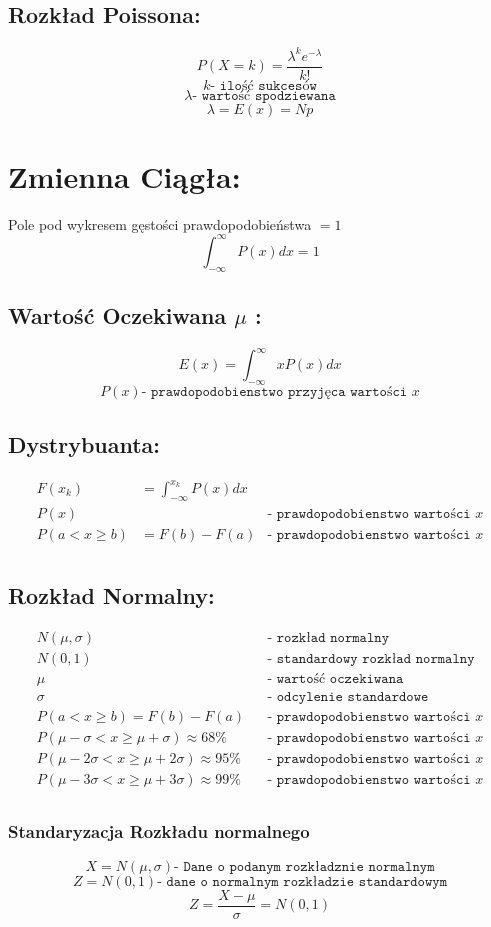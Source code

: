 \documentclass[fleqn]{article}
\begin{document}
\subsection*{Rozkład Poissona:}
\[P(X=k) = \frac{\lambda^ke^{-\lambda}}{k!}\]
\[k \texttt{- ilość sukcesów}\]
\[\lambda \texttt{- wartość spodziewana}\]
\[\lambda = E(x) = Np\]
\pagebreak
\section*{Zmienna Ciągła:}
Pole pod wykresem gęstości prawdopodobieństwa \(=1\)
\[\int_{-\infty}^{\infty}{P(x)dx}=1\]

\subsection*{Wartość Oczekiwana \(\mu\) :}
\[E(x) = \int_{-\infty}^{\infty}{xP(x)dx}\]
\[P(x) \texttt{- prawdopodobienstwo przyjęca wartości }x\]
\subsection*{Dystrybuanta:}
\begin{align*}
F(x_k)& = \int_{-\infty}^{x_k}{P(x)dx}\\
P(x) & & \texttt{- prawdopodobienstwo wartości }x\\
P(a < x \geq b)&= F(b)-F(a) &\texttt{- prawdopodobienstwo wartości }x\\
\end{align*}



\subsection*{Rozkład Normalny:}
\begin{align*}
N(\mu,\sigma)&&\texttt{- rozkład normalny}\\
N(0,1)& &\texttt{- standardowy rozkład normalny}\\
\mu& &\texttt{- wartość oczekiwana}\\
\sigma& &\texttt{- odcylenie standardowe}\\
P(a < x \geq b) = F(b)-F(a)& &\texttt{- prawdopodobienstwo wartości }x\\
P(\mu -\sigma < x \geq \mu+\sigma) \approx 68\%& &\texttt{- prawdopodobienstwo wartości }x  \\
P(\mu -2\sigma < x \geq \mu+2\sigma) \approx 95\%& &\texttt{- prawdopodobienstwo wartości }x \\
P(\mu -3\sigma < x \geq \mu+3\sigma) \approx 99\%& &\texttt{- prawdopodobienstwo wartości }x \\
\end{align*}

\subsubsection*{Standaryzacja Rozkładu normalnego}
\[X = N(\mu,\sigma) \texttt{- Dane o podanym rozkładznie normalnym}\]
\[Z = N(0,1) \texttt{- dane o normalnym rozkładzie standardowym}\]
\[Z = \frac{X-\mu}{\sigma} = N(0,1) \]
\end{document}
